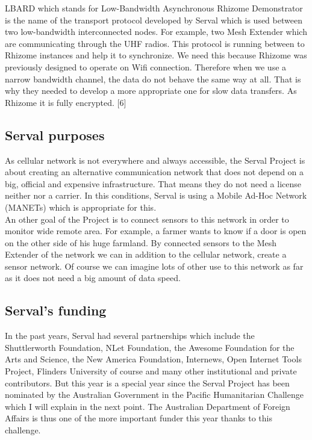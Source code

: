 \par
LBARD which stands for Low-Bandwidth Asynchronous Rhizome Demonstrator is the name of the transport protocol developed by Serval which is used between two low-bandwidth interconnected nodes. For example, two Mesh Extender which are communicating through the UHF radios. This protocol is running between to Rhizome instances and help it to synchronize. We need this because Rhizome was previously designed to operate on Wifi connection. Therefore when we use a narrow bandwidth channel, the data do not behave the same way at all.  That is why they needed to develop a more appropriate one for slow data transfers. As Rhizome it is fully encrypted. [6]

\subsection{Serval purposes}
As cellular network is not everywhere and always accessible, the Serval Project is about creating an alternative communication network that does not depend on a big, official and expensive infrastructure. That means they do not need a license neither nor a carrier. In this conditions, Serval is using a Mobile Ad-Hoc Network (MANETs) which is appropriate for this. \\
An other goal of the Project is to connect sensors to this network in order to monitor wide remote area. For example, a farmer wants to know if a door is open on the other side of his huge farmland. By connected sensors to the Mesh Extender of the network we can in addition to the cellular network, create a sensor network. Of course we can imagine lots of other use to this network as far as it does not need a big amount of data speed. 

\subsection{Serval's funding}
In the past years, Serval had several partnerships which include the Shuttlerworth Foundation, NLet Foundation, the Awesome Foundation for the Arts and Science, the New America Foundation, Internews, Open Internet Tools Project, Flinders University of course and many other institutional and private contributors. But this year is a special year since the Serval Project has been nominated by the Australian Government in the Pacific Humanitarian Challenge which I will explain in the next point. The Australian Department of Foreign Affairs is thus one of the more important funder this year thanks to this challenge. 


